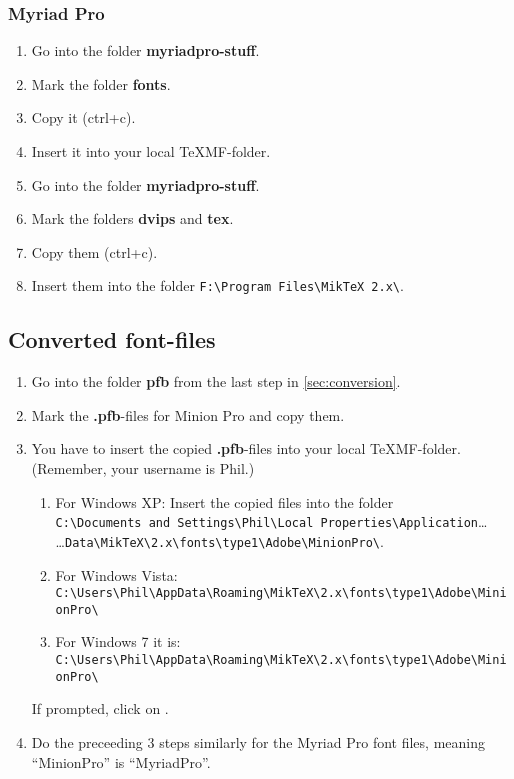 \subsubsection{Myriad Pro}

\begin{enumerate}
	\item Go into the folder \textbf{myriadpro-stuff}.
	\item Mark the folder \textbf{fonts}.
	\item Copy it (ctrl+c).
	\item Insert it into your local {\TeX}MF-folder.
	\item Go into the folder \textbf{myriadpro-stuff}.
	\item Mark the folders \textbf{dvips} and \textbf{tex}.
	\item Copy them (ctrl+c).
	\item Insert them into the folder \verb+F:\Program Files\MikTeX 2.x\+.
\end{enumerate}

\subsection{Converted font-files}

\begin{enumerate}
	\item Go into the folder \textbf{pfb} from the last step in \autoref{sec:conversion}.
	\item Mark the \textbf{.pfb}-files for Minion Pro and copy them.
	\item You have to insert the copied \textbf{.pfb}-files into your local {\TeX}MF-folder. (Remember, your username is Phil.)
	\begin{enumerate}
		\item For Windows XP: Insert the copied files into the folder\\
		\verb+C:\Documents and Settings\Phil\Local Properties\Application+\ldots\\
		\ldots\verb+Data\MikTeX\2.x\fonts\type1\Adobe\MinionPro\+.
		\item \normalsize For Windows Vista:\\
		\verb+C:\Users\Phil\AppData\Roaming\MikTeX\2.x\fonts\type1\Adobe\MinionPro\+
		\item For Windows 7 it is:\\
		\verb+C:\Users\Phil\AppData\Roaming\MikTeX\2.x\fonts\type1\Adobe\MinionPro\+
	\end{enumerate}
	\normalsize If prompted, click on .
	\item Do the preceeding 3 steps similarly for the Myriad Pro font files, meaning ``MinionPro'' is ``MyriadPro''.
\end{enumerate}

